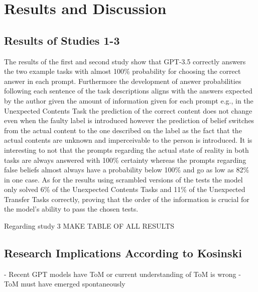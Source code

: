 \section{Results and Discussion}
\subsection{Results of Studies 1-3}
The results of the first and second study show that GPT-3.5 correctly answers the two example tasks with almost 100\% probability for choosing the correct answer in each prompt. Furthermore the development of answer probabilities following each sentence of the task descriptions aligns with the answers expected by the author given the amount of information given for each prompt e.g., in the Unexpected Contents Task the prediction of the correct content does not change even when the faulty label is introduced however the prediction of belief switches from the actual content to the one described on the label as the fact that the actual contents are unknown and imperceivable to the person is introduced. It is interesting to not that the prompts regarding the actual state of reality in both tasks are always answered with 100\% certainty whereas the prompts regarding false beliefs almost always have a probability below 100\% and go as low as 82\% in one case. As for the results using scrambled versions of the tests the model only solved 6\% of the Unexpected Contents Tasks and 11\% of the Unexpected Transfer Tasks correctly, proving that the order of the information is crucial for the model's ability to pass the chosen tests.

Regarding study 3 
MAKE TABLE OF ALL RESULTS
\subsection{Research Implications According to Kosinski}
- Recent GPT models have ToM or current understanding of ToM is wrong
- ToM must have emerged spontaneously
